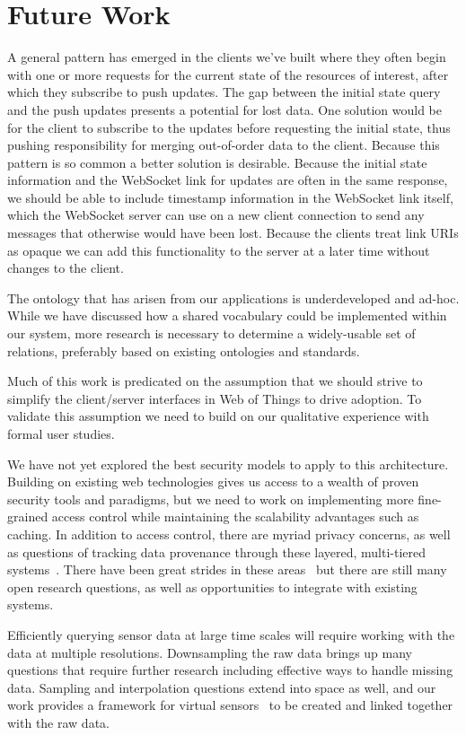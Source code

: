 \documentclass{acm_proc_article-sp}
\begin{document}
\section{Future Work}

A general pattern has emerged in the clients we've built where they often begin
with one or more requests for the current state of the resources of interest,
after which they subscribe to push updates. The gap between the initial state
query and the push updates presents a potential for lost data. One solution
would be for the client to subscribe to the updates before requesting the
initial state, thus pushing responsibility for merging out-of-order data to the
client. Because this pattern is so common a better solution is desirable.
Because the initial state information and the WebSocket link for updates are
often in the same response, we should be able to include timestamp information
in the WebSocket link itself, which the WebSocket server can use on a new
client connection to send any messages that otherwise would have been lost.
Because the clients treat link URIs as opaque we can add this functionality to
the server at a later time without changes to the client.

The ontology that has arisen from our applications is underdeveloped and
ad-hoc. While we have discussed how a shared vocabulary could be implemented
within our system, more research is necessary to determine a widely-usable set
of relations, preferably based on existing ontologies and standards.

Much of this work is predicated on the assumption that we should strive to
simplify the client/server interfaces in Web of Things to drive adoption. To
validate this assumption we need to build on our qualitative experience with
formal user studies.

We have not yet explored the best security models to apply to this
architecture. Building on existing web technologies gives us access to a wealth
of proven security tools and paradigms, but we need to work on implementing
more fine-grained access control while maintaining the scalability advantages
such as caching. In addition to access control, there are myriad privacy
concerns, as well as questions of tracking data provenance through these
layered, multi-tiered systems~\cite{balazinska2007}. There have been great
strides in these areas~\cite{de2014openpds} but there are still many open
research questions, as well as opportunities to integrate with existing
systems.

Efficiently querying sensor data at large time scales will require working with
the data at multiple resolutions. Downsampling the raw data brings up many
questions that require further research including effective ways to handle
missing data. Sampling and interpolation questions extend into space as well,
and our work provides a framework for virtual sensors~\cite{sarkar2014no} to be
created and linked together with the raw data.
\end{document}
